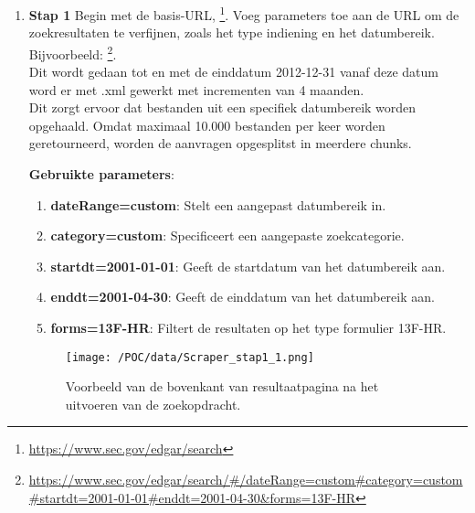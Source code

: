 \begin{enumerate}
    \item \textbf{Stap 1} Begin met de basis-URL, \footnote{\href{https://www.sec.gov/edgar/search/}{https://www.sec.gov/edgar/search}}. Voeg parameters toe aan de URL om de zoekresultaten te verfijnen, zoals het type indiening en het datumbereik. \\
    Bijvoorbeeld: \footnote{\href{https://www.sec.gov/edgar/search/\#/dateRange=custom\#category=custom\#startdt=2001-01-01\#enddt=2001-04-30\#forms=13F-HR}{https://www.sec.gov/edgar/search/\#/dateRange=custom\#category=custom\#startdt=2001-01-01\#enddt=2001-04-30\&forms=13F-HR}}.\\
    Dit wordt gedaan tot en met de einddatum 2012-12-31 vanaf deze datum word er met .xml gewerkt met incrementen van 4 maanden.\\
    Dit zorgt ervoor dat bestanden uit een specifiek datumbereik worden opgehaald. Omdat maximaal 10.000 bestanden per keer worden geretourneerd, worden de aanvragen opgesplitst in meerdere chunks.


    \textbf{Gebruikte parameters}:
    \begin{enumerate}
            \item \textbf{dateRange=custom}: Stelt een aangepast datumbereik in.
            \item \textbf{category=custom}: Specificeert een aangepaste zoekcategorie.
            \item \textbf{startdt=2001-01-01}: Geeft de startdatum van het datumbereik aan.
            \item \textbf{enddt=2001-04-30}: Geeft de einddatum van het datumbereik aan.
            \item \textbf{forms=13F-HR}: Filtert de resultaten op het type formulier 13F-HR.

    \end{enumerate}
     \begin{figure}[H]
        \centering
        \texttt{[image: /POC/data/Scraper\_stap1\_1.png]}
        \caption{Voorbeeld van de bovenkant van resultaatpagina na het uitvoeren van de zoekopdracht.}
        \label{fig:result_s1_1}
    \end{figure}
    

\end{enumerate}
